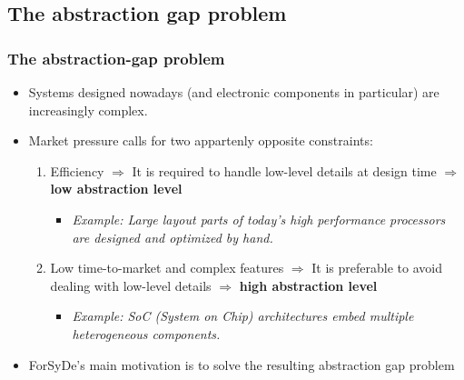 \documentclass{beamer}
\begin{document}
\subsection{The abstraction gap problem}
\begin{frame}
  \frametitle{The abstraction-gap problem}

  \begin{itemize}
  \item Systems designed nowadays (and electronic components in
    particular) are increasingly complex.
  
  \item Market pressure calls for two appartenly opposite constraints:
    \begin{enumerate}
    \item Efficiency $\Rightarrow$ It is required to handle low-level
      details at design time $\Rightarrow$ \textbf{low abstraction
        level}
      \begin{itemize}
      \item \textit{Example: Large layout parts of today's high
          performance processors are designed and optimized by hand.}
      \end{itemize}
    \item Low time-to-market and complex features $\Rightarrow$ It is
      preferable to avoid dealing with low-level details $\Rightarrow$
      \textbf{high abstraction level}
      \begin{itemize}
      \item \textit{Example: SoC (System on Chip) architectures embed
          multiple heterogeneous components. }
      \end{itemize}
    \end{enumerate}
  \item ForSyDe's main motivation is to solve the resulting
    abstraction gap problem
  \end{itemize}
\end{frame}
\end{document}
